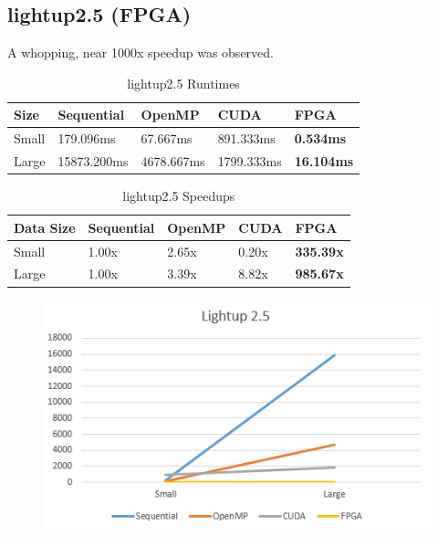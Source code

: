 \documentclass{acm_proc_article-sp}
\begin{document}
\subsection{lightup2.5 (FPGA)}
A whopping, near 1000x speedup was observed.
\begin{table}[H]
\centering
\caption{lightup2.5 Runtimes}
\begin{tabular}{|l|l|l|l|l|} \hline
Size&Sequential&OpenMP&CUDA&FPGA\\ \hline
Small & 179.096ms & 67.667ms & 891.333ms & \textbf{0.534ms} \\ \hline
Large & 15873.200ms & 4678.667ms & 1799.333ms & \textbf{16.104ms} \\ \hline
\end{tabular}
\end{table}
\begin{table}[H]
\centering
\caption{lightup2.5 Speedups}
\begin{tabular}{|l|l|l|l|l|} \hline
Data Size&Sequential&OpenMP&CUDA&FPGA\\ \hline
Small & 1.00x & 2.65x & 0.20x & \textbf{335.39x} \\ \hline
Large & 1.00x & 3.39x & 8.82x & \textbf{985.67x} \\ \hline
\end{tabular}
\end{table}
\begin{figure}[H]
  \includegraphics[width=\linewidth,natwidth=476,natheight=282]{lightup25_comparison.png}
  \label{fig:lightup2.5_comparison}
\end{figure}
\end{document}
